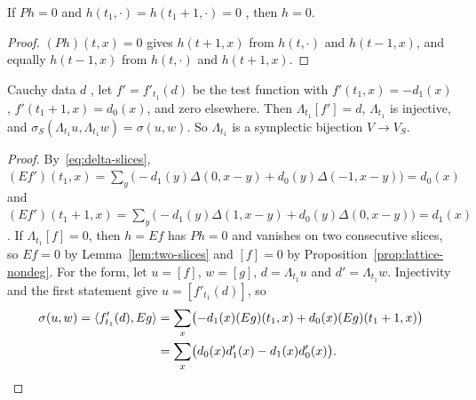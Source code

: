 \begin{lemma}\label{lem:two-slices}
If  $Ph=0$  and
$h(t_1,\cdot)=h(t_1+1,\cdot)=0$ , then $h=0$.
\end{lemma}
\begin{proof}
$(Ph)(t,x)=0$ gives $h(t+1,x)$ from $h(t,\cdot)$ and $h(t-1,x)$, and equally $h(t-1,x)$ from
$h(t,\cdot)$ and $h(t+1,x)$. 
\end{proof}
\noindent{}

\begin{theorem}\label{thm:cauchy-map}
 Cauchy data $d$ , let
$f'=f'_{t_1}(d)$ be the test function with $f'(t_1,x)=-d_1(x)$,
$f'(t_1+1,x)=d_0(x)$, and zero elsewhere. Then $\Lambda_{t_1}[f']=d$, $\Lambda_{t_1}$ is
injective, and $\sigma_S(\Lambda_{t_1}u,\Lambda_{t_1}w)=\sigma(u,w)$. So $\Lambda_{t_1}$ is a
symplectic bijection $V\to V_S$.
\end{theorem}
\begin{proof}
By~\eqref{eq:delta-slices},
$(Ef')(t_1,x)=\sum_y\bigl(-d_1(y)\Delta(0,x-y)+d_0(y)\Delta(-1,x-y)\bigr)=d_0(x)$ and
$(Ef')(t_1+1,x)=\sum_y\bigl(-d_1(y)\Delta(1,x-y)+d_0(y)\Delta(0,x-y)\bigr)=d_1(x)$. If
$\Lambda_{t_1}[f]=0$, then $h=Ef$ has $Ph=0$ and vanishes on two consecutive slices, so $Ef=0$
by Lemma~\ref{lem:two-slices} and $[f]=0$ by Proposition~\ref{prop:lattice-nondeg}. For the
form, let $u=[f]$, $w=[g]$, $d=\Lambda_{t_1}u$ and $d'=\Lambda_{t_1}w$. Injectivity and the first
statement give $u=[f'_{t_1}(d)]$, so
\[
\begin{aligned}
\sigma(u,w)=\langle f'_{t_1}(d),Eg\rangle
&=\sum_x\bigl(-d_1(x)(Eg)(t_1,x)+d_0(x)(Eg)(t_1+1,x)\bigr)\\
&=\sum_x\bigl(d_0(x)d_1'(x)-d_1(x)d_0'(x)\bigr).
\end{aligned}
\qedhere
\]
\end{proof}
\noindent{}

